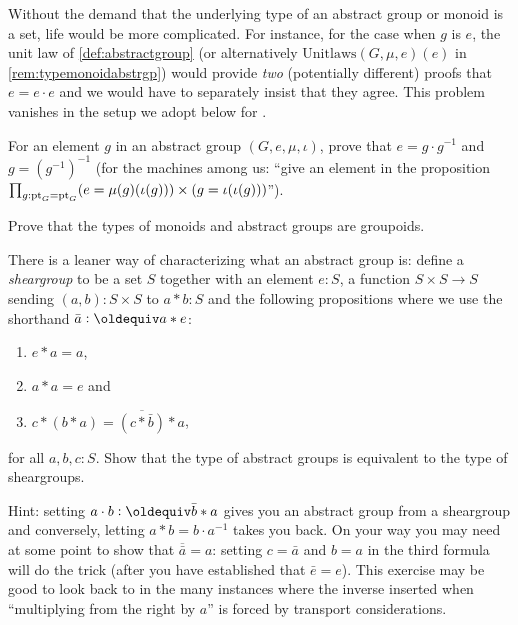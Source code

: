   \begin{remark}
Without the demand that the underlying type of an abstract group or monoid is a set, life would be more complicated.  For instance, for the case when $g$ is $e$, the unit law of \cref{def:abstractgroup} (or alternatively $\mathrm{Unitlaws}(G,\mu{},e)(e)$ in \cref{rem:typemonoidabstrgp}) would provide \emph{two} (potentially different) proofs that $e=e\cdot e$ and we would have to separately insist that they agree.  This problem vanishes in the setup we adopt below for \inftygps.
  \end{remark}

  \begin{xca}
    For an element $g$ in an abstract group $(G,e,\mu,\iota)$, prove that $e=g\cdot g^{-1}$ and $g=(g^{-1})^{-1}$ (for the machines among us: ``give an element in the proposition
$\prod_{g:{\mathord{\mathrm{pt}}}_G={\mathord{\mathrm{pt}}}_G}
(e=\mu{}(g)(\iota{}(g)))\times
(g=\iota{}(\iota{}(g)))$'').
  \end{xca}
  \begin{xca}\label{xca:typemonoidisgroupoid}
    Prove that the types of monoids and abstract groups are groupoids.
  \end{xca}
  \begin{xca}
    \label{xca:cheapgroup}
    There is a leaner way of characterizing what an abstract group is: define a \emph{sheargroup} to be a set $S$ together with an element $e:S$, a function $S\times S\to S$ sending $(a,b):S\times S$ to $a*b:S$ and the following propositions where we use the shorthand $\bar a\defequi a*e$:
    \begin{enumerate}
    \item $e*a=a$,
    \item $a*a=e$ and
    \item $c*(b*a)=\overline{(c*\bar b)}*a$,
    \end{enumerate}
    for all $a,b,c:S$.
    Show that the type of abstract groups is equivalent to the type of sheargroups.  

Hint: setting $a\cdot b\defequi \bar b*a$ gives you an abstract group from a sheargroup and conversely, letting $a*b=b\cdot a^{-1}$ takes you back.  On your way you may need at some point to show that $\overline{\bar a}=a$: setting $c=\bar a$ and $b=a$ in the third formula will do the trick (after you have established that $\bar e=e$).  This exercise may be good to look back to in the many instances where the inverse inserted when ``multiplying from the right by $a$'' is forced by transport considerations. 
  \end{xca}




